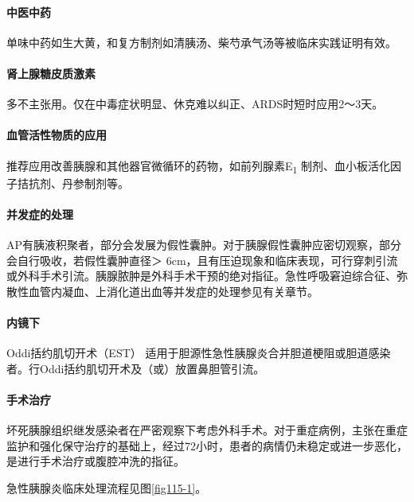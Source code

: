 \paragraph{中医中药}

单味中药如生大黄，和复方制剂如清胰汤、柴芍承气汤等被临床实践证明有效。

\paragraph{肾上腺糖皮质激素}

多不主张用。仅在中毒症状明显、休克难以纠正、ARDS时短时应用2～3天。

\paragraph{血管活性物质的应用}

推荐应用改善胰腺和其他器官微循环的药物，如前列腺素E\textsubscript{1}
制剂、血小板活化因子拮抗剂、丹参制剂等。

\paragraph{并发症的处理}

AP有胰液积聚者，部分会发展为假性囊肿。对于胰腺假性囊肿应密切观察，部分会自行吸收，若假性囊肿直径＞
6cm，且有压迫现象和临床表现，可行穿刺引流或外科手术引流。胰腺脓肿是外科手术干预的绝对指征。急性呼吸窘迫综合征、弥散性血管内凝血、上消化道出血等并发症的处理参见有关章节。

\paragraph{内镜下}

Oddi括约肌切开术（EST）
适用于胆源性急性胰腺炎合并胆道梗阻或胆道感染者。行Oddi括约肌切开术及（或）放置鼻胆管引流。

\paragraph{手术治疗}

坏死胰腺组织继发感染者在严密观察下考虑外科手术。对于重症病例，主张在重症监护和强化保守治疗的基础上，经过72小时，患者的病情仍未稳定或进一步恶化，是进行手术治疗或腹腔冲洗的指征。

急性胰腺炎临床处理流程见图\ref{fig115-1}。

